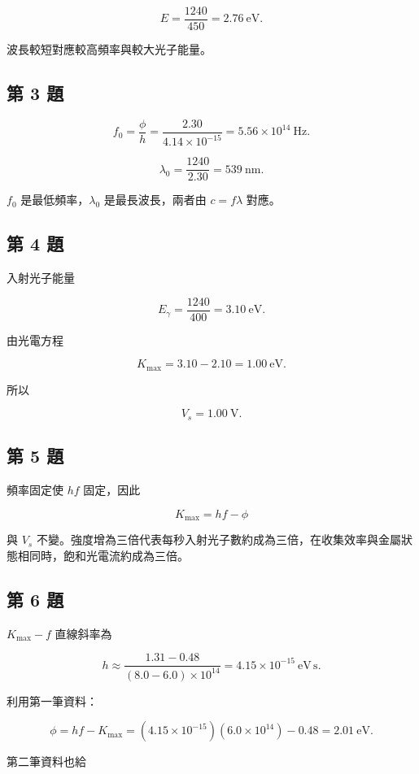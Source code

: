 \documentclass[11pt,a4paper]{article}
\begin{document}
\[
E=\frac{1240}{450}=2.76\ \mathrm{eV}.
\]

波長較短對應較高頻率與較大光子能量。

\subsection{第 3 題}\label{ux7b2c-3-ux984c}

\[
f_0=\frac{\phi}{h}
=\frac{2.30}{4.14\times10^{-15}}
=5.56\times10^{14}\ \mathrm{Hz}.
\]

\[
\lambda_0=\frac{1240}{2.30}
=539\ \mathrm{nm}.
\]

\(f_0\) 是最低頻率，\(\lambda_0\) 是最長波長，兩者由 \(c=f\lambda\) 對應。

\subsection{第 4 題}\label{ux7b2c-4-ux984c}

入射光子能量

\[
E_\gamma=\frac{1240}{400}=3.10\ \mathrm{eV}.
\]

由光電方程

\[
K_{\max}=3.10-2.10=1.00\ \mathrm{eV}.
\]

所以

\[
V_s=1.00\ \mathrm V.
\]

\subsection{第 5 題}\label{ux7b2c-5-ux984c}

頻率固定使 \(hf\) 固定，因此

\[
K_{\max}=hf-\phi
\]

與 \(V_s\) 不變。強度增為三倍代表每秒入射光子數約成為三倍，在收集效率與金屬狀態相同時，飽和光電流約成為三倍。

\subsection{第 6 題}\label{ux7b2c-6-ux984c}

\(K_{\max}-f\) 直線斜率為

\[
h\approx
\frac{1.31-0.48}{(8.0-6.0)\times10^{14}}
=4.15\times10^{-15}\ \mathrm{eV\,s}.
\]

利用第一筆資料：

\[
\phi=hf-K_{\max}
=(4.15\times10^{-15})(6.0\times10^{14})-0.48
=2.01\ \mathrm{eV}.
\]

第二筆資料也給
\end{document}
